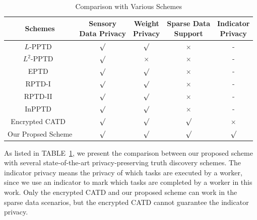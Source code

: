 \documentclass[conference]{IEEEtran}
\begin{document}
\begin{table}[htbp]
  \centering
  \caption{Comparison with Various Schemes}~\label{tab:security}
  \linespread{1.3}\selectfont
  \begin{adjustbox}{max width=0.46\textwidth}
  \begin{tabular}{ccccc}
    \hline
    \hline
    Schemes & \makecell[c]{Sensory \\ Data Privacy} & \makecell[c]{Weight \\ Privacy} & \makecell[c]{Sparse Data \\ Support} & \makecell[c]{Indicator \\ Privacy} \\
    \hline
    $L$-PPTD~\cite{miao_lightweight_2017} & $\surd$ & $\surd$ & $\times$ & - \\
    $L^2$-PPTD~\cite{miao_lightweight_2017} & $\surd$ & $\times$ & $\times$ & - \\
    EPTD~\cite{xu_efficient_2019} & $\surd$ & $\surd$ & $\times$ & - \\
    RPTD-I~\cite{zhang_reliable_2019} & $\surd$ & $\surd$ & $\times$ & - \\
    RPTD-II~\cite{zhang_reliable_2019} & $\surd$ & $\surd$ & $\times$ & - \\
    InPPTD~\cite{xue_inpptd_2020} & $\surd$ & $\surd$ & $\times$ & - \\
    Encrypted CATD~\cite{zheng_learning_2018} & $\surd$ & $\surd$ & $\surd$ & $\times$ \\
    Our Propsed Scheme & $\surd$ & $\surd$ & $\surd$ & $\surd$ \\
    \hline
    \hline
  \end{tabular}  
  \end{adjustbox}
\end{table}

As listed in TABLE~\ref{tab:security}, we present the comparison between our proposed scheme with several state-of-the-art privacy-preserving truth discovery schemes.
The indicator privacy means the privacy of which tasks are executed by a worker, since we use an indicator to mark which tasks are completed by a worker in this work.
Only the encrypted CATD and our proposed scheme can work in the sparse data scenarios, but the encrypted CATD cannot guarantee the indicator privacy.
\end{document}
